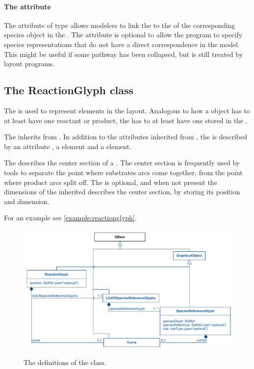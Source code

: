 \paragraph{The  attribute}
The  attribute of type  allows modelers to link the \SpeciesGlyph to the  of the corresponding species object  in the \Model. The  attribute is optional to allow the  program to specify species representations that do not have a direct  correspondence in the model. This might be useful if some pathway has been collapsed, but is still treated by layout programs. 


\subsection{The ReactionGlyph class}
\label{reactionglyph-class}
The \ReactionGlyph is used to represent \Reaction elements in the 
layout. Analogous to how a \Reaction object has to at least have one reactant 
or product, the \ReactionGlyph has to at least have one 
\SpeciesReferenceGlyph stored in the \ListOfSpeciesReferenceGlyphs. 

The \ReactionGlyph inherits from \GraphicalObject. In addition to the attributes inherited from \GraphicalObject, the 
\ReactionGlyph is described by an attribute , a \Curve 
element and a  element. 

The \Curve describes the center section of a \ReactionGlyph. The center section is frequently used by tools to separate the point where substrates arcs come together, from the point where product arcs split off. The \Curve is optional, and when not present the dimensions of the inherited \BoundingBox describes the center section, by storing its position and dimension. 

For an example see \ref{example:reactionglyph}. 


\begin{figure}[!h]
\includegraphics{uml/layout-reactionglyph-model-uml}\\
\label{uml:reactionglyph}
\caption{The definitions of the \ReactionGlyph class.}
\end{figure}


